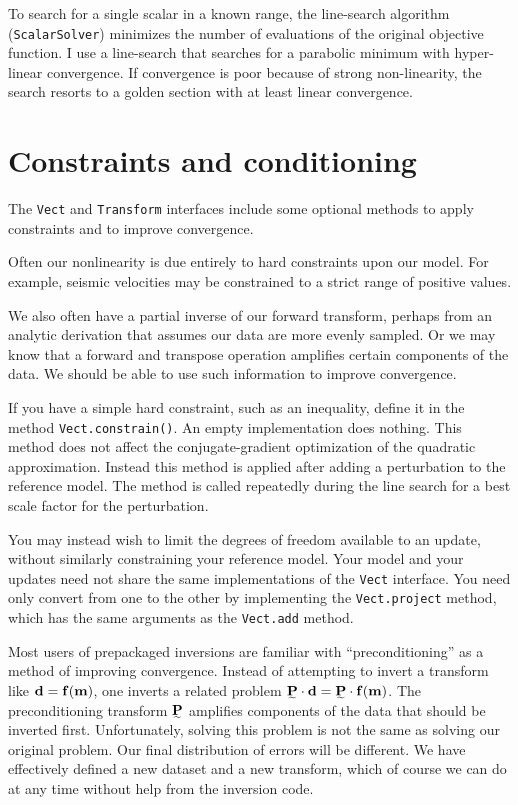 \documentclass[12pt]{article}
\begin{document}
To search for a single scalar in a known
range, the line-search algorithm
(\texttt{ScalarSolver}) minimizes the number
of evaluations of the original objective
function.  I use a line-search that searches
for a parabolic minimum with hyper-linear
convergence.  If convergence is poor because
of strong non-linearity, the search resorts
to a golden section with at least linear
convergence.

\section {Constraints and conditioning}

The \texttt{Vect} and \texttt{Transform}
interfaces include some optional methods to
apply constraints and to improve convergence.

Often our nonlinearity is due entirely to
hard constraints upon our model.  For
example, seismic velocities may be
constrained to a strict range of positive
values.

We also often have a partial inverse of our
forward transform, perhaps from an analytic
derivation that assumes our data are more
evenly sampled.  Or we may know that a
forward and transpose operation amplifies
certain components of the data.  We should be
able to use such information to improve
convergence.

If you have a simple hard constraint, such as
an inequality, define it in the method
\texttt{Vect.constrain()}.  An empty
implementation does nothing.  This method
does not affect the conjugate-gradient
optimization of the quadratic approximation.
Instead this method is applied after adding a
perturbation to the reference model.  The
method is called repeatedly during the line
search for a best scale factor for the
perturbation.

You may instead wish to limit the degrees of
freedom available to an update, without
similarly constraining your reference model.
Your model and your updates need not share
the same implementations of the \texttt{Vect}
interface.  You need only convert from one to
the other by implementing the
\texttt{Vect.project} method, which has the
same arguments as the \texttt{Vect.add}
method.

Most users of prepackaged inversions are
familiar with ``preconditioning'' as a method
of improving convergence.  Instead of
attempting to invert a transform like ${{\mbox{\boldmath $\bf d$}}} =
{{\mbox{\boldmath $\bf f$}}} ({{\mbox{\boldmath $\bf m$}}})$, one inverts a related problem
$\Pt \cdot \dv = \Pt \cdot \fv (\mv)$.  The
preconditioning transform $\Pt$ amplifies
components of the data that should be
inverted first.  Unfortunately, solving this
problem is not the same as solving our
original problem.  Our final distribution of
errors will be different.  We have
effectively defined a new dataset and a new
transform, which of course we can do at any
time without help from the inversion code.
\end{document}
